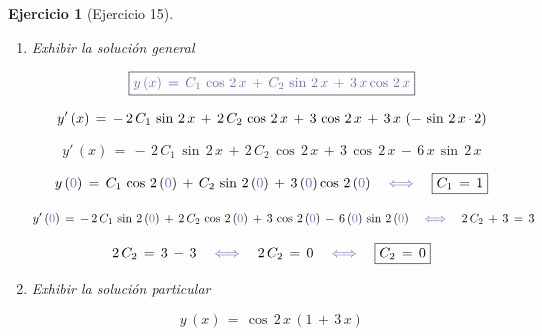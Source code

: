 \documentclass[a4paper,11pt, openany]{book}
\newtheorem{ejer}{Ejercicio}[section]
\newcommand*{\itembolasazules}[1]{%
\footnotesize\protect\tikz[baseline=-3pt]%
\protect\node[scale=.7, circle, shade, ball
color=green]{\color{white}\Large\bf#1};}
\begin{document}
\begin{ejer}[Ejercicio 15]
\begin{enumerate}[label=\itembolasazules{\arabic*}]
\begin{multline*}
4\,M\,\cos\,2\,x\,-\,4\,N\,\sin\,2\,x\,-\,\cancel{4\,M\,x\,\sin\,2\,x}\,-\,\cancel{4\,N\,x\,\cos\,2\,x}\,+\, \\
\cancel{4\,M\,x\,\sin\,2\,x}\,+\,\cancel{4\,N\,x\,\cos\,2\,x}\,=\,-\,12\,\sin\,2\,x    
\end{multline*}
 
$$4\,M\,=\,0 \quad \quad \textcolor{toolbox}{\iff} \quad \boxed{M\,=\,0}$$
 
$$-\,4\,N\,=\,-\,12 \quad \textcolor{toolbox}{\iff} \quad N\,=\,\dfrac{-\,12}{-\,4} \quad \textcolor{toolbox}{\iff} \quad \boxed{N\,=\,3}$$
 
\item Exhibir la solución general 
 
$$\boxed{\textcolor{toolbox}{y\,(x)\,=\,C_{1}\,\cos\,2\,x\,+\,C_{2}\,\sin\,2\,x\,+\,3\,x\cos\,2\,x} } $$
 
$$y'\,(x)\,=\,-\,2\,C_{1}\,\sin\,2\,x\,+\,2\,C_{2}\,\cos\,2\,x\,+\,3\,\cos\,2\,x\,+\,3\,x\,\left(-\,\sin\,2\,x\,\textcolor{toolbox}{\cdot}\,2 \right) $$
 
$$\boxed{y'\,(x)\,=\,-\,2\,C_{1}\,\sin\,2\,x\,+\,2\,C_{2}\,\cos\,2\,x\,+\,3\,\cos\,2\,x\,-\,6\,x\,\sin\,2\,x }$$
 
$$y\,(\textcolor{toolbox}{0})\,=\,C_{1}\,\cos\,2\,(\textcolor{toolbox}{0})\,+\,C_{2}\,\sin\,2\,(\textcolor{toolbox}{0})\,+\,3\,(\textcolor{toolbox}{0})\cos\,2\,(\textcolor{toolbox}{0}) \quad \textcolor{toolbox}{\iff} \quad \boxed{C_{1}\,=\,1}$$
 
$$y'\,(\textcolor{toolbox}{0})\,=\,-\,2\,C_{1}\,\sin\,2\,(\textcolor{toolbox}{0})\,+\,2\,C_{2}\,\cos\,2\,(\textcolor{toolbox}{0})\,+\,3\,\cos\,2\,(\textcolor{toolbox}{0})\,-\,6\,(\textcolor{toolbox}{0})\,\sin\,2\,(\textcolor{toolbox}{0}) \quad \textcolor{toolbox}{\iff} \quad 2\,C_{2}\,+\,3\,=\,3$$
 
$$2\,C_{2}\,=\,3\,-\,3 \quad \textcolor{toolbox}{\iff} \quad 2\,C_{2}\,=\,0 \quad \textcolor{toolbox}{\iff} \quad \boxed{C_{2}\,=\,0}$$
 
\item Exhibir la solución particular
 
$$\boxed{y\,(x)\,=\,\cos\,2\,x\,\left(1\,+\,3\,x \right)}$$
 
\end{enumerate}
 
\end{ejer}
 
\end{document}
